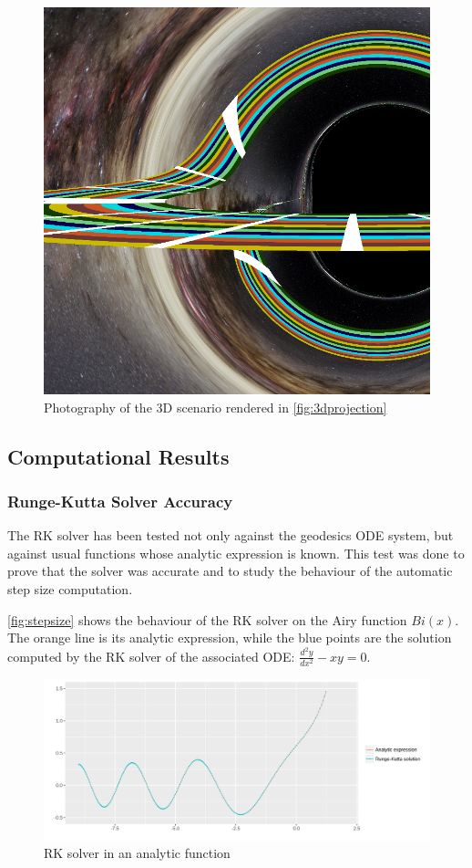 \begin{figure}[bth]
	\myfloatalign
	\includegraphics[width=.7\linewidth]{gfx/3d_01_image}
	\caption[Photography from a 3D scenario]{Photography of the 3D scenario rendered in \autoref{fig:3dprojection}}
	\label{fig:3dprojectionimage}
\end{figure}

\subsection{Computational Results}

\subsubsection*{Runge-Kutta Solver Accuracy}

The \ac{RK} solver has been tested not only against the geodesics \ac{ODE} system, but against usual functions whose analytic expression is known. This test was done to prove that the solver was accurate and to study the behaviour of the automatic step size computation.

\autoref{fig:stepsize} shows the behaviour of the \ac{RK} solver on the Airy function $Bi(x)$. The orange line is its analytic expression, while the blue points are the solution computed by the \ac{RK} solver of the associated \ac{ODE}: $\frac{d^2y}{dx^2} - xy = 0$.

\begin{figure}[bth]
	\myfloatalign
	\includegraphics[width=1.3\linewidth]{gfx/analytic}
	\caption[Solver in an analytic function]{\ac{RK} solver in an analytic function}
	\label{fig:stepsize}
\end{figure}

